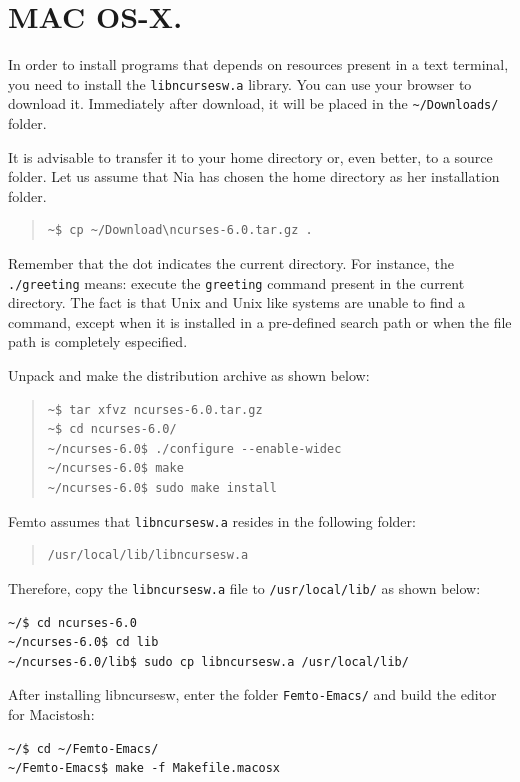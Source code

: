 \documentclass[a4paper,12pt]{book}
\begin{document}
  
\section{MAC OS-X.}
In order to install programs that depends
on resources present in a text terminal,
you need to install the
\verb|libncursesw.a| library. You can
use your browser to download it.
Immediately after download, it will be
placed in the \verb|~/Downloads/| folder.

It is advisable to transfer it to your
home directory or, even better, to a
source folder. Let us assume that Nia
has chosen the home directory as her
installation folder.
\begin{quote}
\begin{verbatim}
~$ cp ~/Download\ncurses-6.0.tar.gz .
\end{verbatim}
\end{quote}
Remember that the dot indicates the current
directory. For instance, the \verb|./greeting|
means: execute the \verb|greeting| command
present in the current directory.
The fact is that Unix and Unix like systems
are unable to find a command, except when
it is installed in a pre-defined search
path or when the file path is completely
especified.

 Unpack and make the distribution archive as shown below:
\begin{quote}
\begin{verbatim}
~$ tar xfvz ncurses-6.0.tar.gz
~$ cd ncurses-6.0/
~/ncurses-6.0$ ./configure --enable-widec
~/ncurses-6.0$ make
~/ncurses-6.0$ sudo make install
\end{verbatim}
\end{quote}
Femto assumes that  \verb|libncursesw.a|
resides in the following folder:
\begin{quote}
\begin{verbatim}
/usr/local/lib/libncursesw.a 
\end{verbatim}
\end{quote}
Therefore, copy the \verb|libncursesw.a| file
to \verb|/usr/local/lib/| as shown below:
\begin{verbatim}
~/$ cd ncurses-6.0 
~/ncurses-6.0$ cd lib 
~/ncurses-6.0/lib$ sudo cp libncursesw.a /usr/local/lib/
\end{verbatim}

After installing libncursesw, enter the folder \verb|Femto-Emacs/|
and build the editor for Macistosh:
\begin{verbatim}
~/$ cd ~/Femto-Emacs/ 
~/Femto-Emacs$ make -f Makefile.macosx
\end{verbatim}
\end{document}
